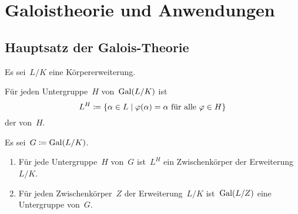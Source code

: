 \chapter{Galoistheorie und Anwendungen}





\section{Hauptsatz der Galois-Theorie}

\begin{convention}
  Es sei~$L/K$ eine Körpererweiterung.
\end{convention}


\begin{definition}
  Für jeden Untergruppe~$H$ von~$\operatorname{Gal}(L/K)$ ist
  \[
    L^H
    \defined
    \{
      \alpha \in L
    \suchthat
      \text{$\varphi(\alpha) = \alpha$ für alle~$\varphi \in H$}
    \}
  \]
  der  von~$H$.
\end{definition}

\begin{lemma}
  Es sei~$G \coloneqq \operatorname{Gal}(L/K)$.
  \begin{enumerate}
    \item
      Für jede Untergruppe~$H$ von~$G$ ist~$L^H$ ein Zwischenkörper der Erweiterung~$L/K$.
    \item
      Für jeden Zwischenkörper~$Z$ der Erweiterung~$L/K$ ist~$\operatorname{Gal}(L/Z)$ eine Untergruppe von~$G$.
  \end{enumerate}
\end{lemma}

